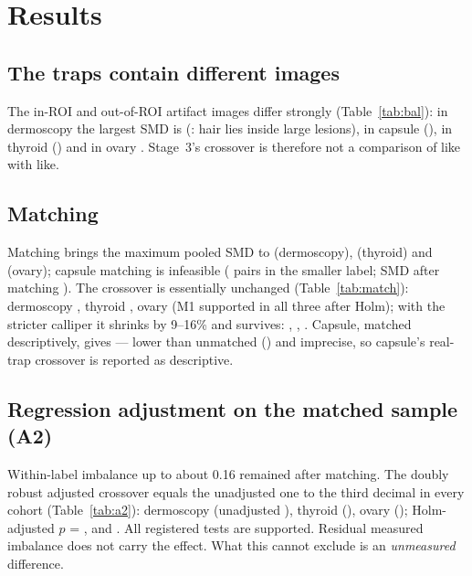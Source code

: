 \section{Results}
\subsection{The traps contain different images}
The in-ROI and out-of-ROI artifact images differ strongly (Table~\ref{tab:bal}): in dermoscopy the largest SMD is
\sFourSmdBeforeHair{} (\sFourWorstHair: hair lies inside large lesions), in capsule \sFourSmdBeforeCap{} (\sFourWorstCap),
in thyroid \sFourSmdBeforeThy{} (\sFourWorstThy) and in ovary \sFourSmdBeforeOv. Stage~3's crossover is therefore not a
comparison of like with like.



\subsection{Matching}
Matching brings the maximum pooled SMD to \sFourSmdAfterHair{} (dermoscopy), \sFourSmdAfterThy{} (thyroid) and
\sFourSmdAfterOv{} (ovary); capsule matching is infeasible (\sFourPairsCap{} pairs in the smaller label; SMD after matching
\sFourSmdAfterCap). The crossover is essentially unchanged (Table~\ref{tab:match}): dermoscopy \sFourMatchHair, thyroid
\sFourMatchThy, ovary \sFourMatchOv{} (M1 supported in all three after Holm); with the stricter calliper it shrinks by
9--16\% and survives: \sFourMatchFiveHair, \sFourMatchFiveThy, \sFourMatchFiveOv. Capsule, matched descriptively, gives
\sFourMatchCap{} --- lower than unmatched (\sFourXCap) and imprecise, so capsule's real-trap crossover is reported as
descriptive.


\subsection{Regression adjustment on the matched sample (A2)}
Within-label imbalance up to about 0.16 remained after matching. The doubly robust adjusted crossover equals the
unadjusted one to the third decimal in every cohort (Table~\ref{tab:a2}): dermoscopy \sFourAdjHair{} (unadjusted
\sFourUnadjHair), thyroid \sFourAdjThy{} (\sFourUnadjThy), ovary \sFourAdjOv{} (\sFourUnadjOv); Holm-adjusted $p$ =
\sFourAdjHolmHair, \sFourAdjHolmThy{} and \sFourAdjHolmOv. All \sFourNATwo{} registered tests are supported. Residual
measured imbalance does not carry the effect. What this cannot exclude is an \emph{unmeasured} difference.



